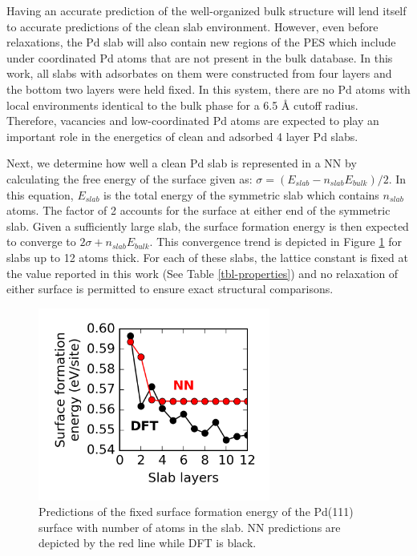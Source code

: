 \documentclass[12pt,oneside]{cmuthesis}
\begin{document}
Having an accurate prediction of the well-organized bulk structure will lend itself to accurate predictions of the clean slab environment. However, even before relaxations, the Pd slab will also contain new regions of the PES which include under coordinated Pd atoms that are not present in the bulk database. In this work, all slabs with adsorbates on them were constructed from four layers and the bottom two layers were held fixed. In this system, there are no Pd atoms with local environments identical to the bulk phase for a 6.5 \AA{} cutoff radius. Therefore, vacancies and low-coordinated Pd atoms are expected to play an important role in the energetics of clean and adsorbed 4 layer Pd slabs.

Next, we determine how well a clean Pd slab is represented in a NN by calculating the free energy of the surface given as: \(\sigma = (E_{slab} - n_{slab} E_{bulk})/2\). In this equation, \(E_{slab}\) is the total energy of the symmetric slab which contains \(n_{slab}\) atoms. The factor of 2 accounts for the surface at either end of the symmetric slab. Given a sufficiently large slab, the surface formation energy is then expected to converge to \(2 \sigma + n_{slab} E_{bulk}\). This convergence trend is depicted in Figure \ref{fig-surface-energy} for slabs up to 12 atoms thick. For each of these slabs, the lattice constant is fixed at the value reported in this work (See Table \ref{tbl-properties}) and no relaxation of either surface is permitted to ensure exact structural comparisons.

\begin{figure}[htbp]
\centering
\includegraphics[width=3in]{./images/surface-energy.png}
\caption{\label{fig-surface-energy}
Predictions of the fixed surface formation energy of the Pd(111) surface with number of atoms in the slab. NN predictions are depicted by the red line while DFT is black.}
\end{figure}
\end{document}
